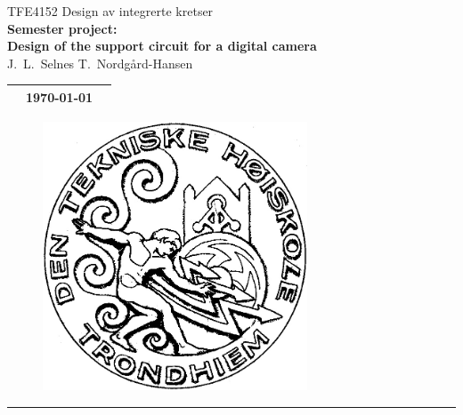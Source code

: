 \documentclass[a4paper, 11pt, english]{article}
\begin{document}
\begin{minipage}[c]{0.85\textwidth}
  \huge \centering
  TFE4152 Design av integrerte kretser\\
  \vspace{1ex}
  \huge \textbf{
    Semester project:\\
    Design of the support circuit for a digital camera
  }\\
  \vspace{1ex}
  \Large
  J.~L.~Selnes T.~Nordgård-Hansen
  \vspace{3ex}
  
  \normalsize
  
  \begin{tabular}{p{} p{} p{}}
    \toprule
    & \today\\
    \bottomrule
  \end{tabular}
\end{minipage}

\begin{figure}[H]
  \centering
  \includegraphics[width=0.7\textwidth]{figures/logo.png}
\end{figure}


\newpage
\setlength{\parskip}{0ex}
\renewcommand{\baselinestretch}{0.1}\normalsize
\onehalfspacing
\tableofcontents
\singlespacing
\renewcommand{\baselinestretch}{1.00}\normalsize
\setlength{\parskip}{2ex}
\rule{\textwidth}{1pt}
\end{document}
